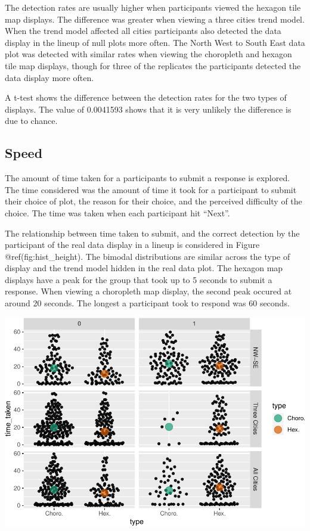 \documentclass[conference,final,]{IEEEtran}
\makeatletter
\def\maxwidth{\ifdim\Gin@nat@width>\linewidth\linewidth
\else\Gin@nat@width\fi}
\let\Oldincludegraphics\includegraphics
\renewcommand{\includegraphics}[1]{\Oldincludegraphics[width=\maxwidth]{#1}}
\makeatother
\begin{document}
The detection rates are usually higher when participants viewed the
hexagon tile map displays. The difference was greater when viewing a
three cities trend model. When the trend model affected all cities
participants also detected the data display in the lineup of null plots
more often. The North West to South East data plot was detected with
similar rates when viewing the choropleth and hexagon tile map displays,
though for three of the replicates the participants detected the data
display more often.

A t-test shows the difference between the detection rates for the two
types of displays. The value of 0.0041593 shows that it is very unlikely
the difference is due to chance.

\hypertarget{speed}{%
\subsection{Speed}\label{speed}}

The amount of time taken for a participants to submit a response is
explored. The time considered was the amount of time it took for a
participant to submit their choice of plot, the reason for their choice,
and the perceived difficulty of the choice. The time was taken when each
participant hit ``Next''.

The relationship between time taken to submit, and the correct detection
by the participant of the real data display in a lineup is considered in
Figure @ref(fig:hist\_height). The bimodal distributions are similar
across the type of display and the trend model hidden in the real data
plot. The hexagon map displays have a peak for the group that took up to
5 seconds to submit a response. When viewing a choropleth map display,
the second peak occured at around 20 seconds. The longest a participant
took to respond was 60 seconds.

\includegraphics{paper_files/figure-latex/unnamed-chunk-1-1.pdf}
\end{document}
